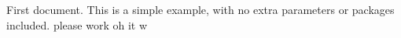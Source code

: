 \documentclass{article}
\begin{document}
First document. This is a simple example, with no 
extra parameters or packages included.
please work
oh it w
\end{document}
